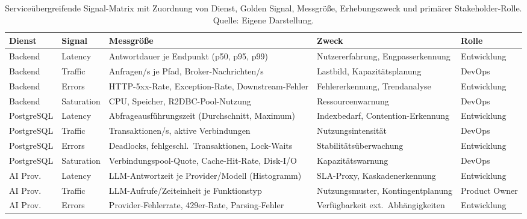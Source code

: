 \begin{table}[!htb]
\centering
\caption[Serviceübergreifende Signal-Matrix mit Zuordnung von Dienst, Golden Signal, Messgröße, Erhebungszweck und primärer Stakeholder-Rolle.]{Serviceübergreifende Signal-Matrix mit Zuordnung von Dienst, Golden Signal, Messgröße, Erhebungszweck und primärer Stakeholder-Rolle. \small Quelle: Eigene Darstellung.}
\label{tab:signal-matrix}
\small
\begin{tabularx}{\textwidth}{
  >{\RaggedRight\arraybackslash}p{1.6cm}
  >{\RaggedRight\arraybackslash}p{1.5cm}
  >{\RaggedRight\arraybackslash}p{5.3cm}
  >{\RaggedRight\arraybackslash}X
  >{\RaggedRight\arraybackslash}p{1.8cm}
}
\toprule
\textbf{Dienst} & \textbf{Signal} & \textbf{Messgröße} & \textbf{Zweck} & \textbf{Rolle} \\
\midrule
Backend   & Latency    & Antwortdauer je Endpunkt (p50, p95, p99)         & Nutzererfahrung, Engpasserkennung   & Entwicklung \\
Backend   & Traffic    & Anfragen/s je Pfad, Broker-Nachrichten/s          & Lastbild, Kapazitätsplanung         & DevOps \\
Backend   & Errors     & HTTP-5xx-Rate, Exception-Rate, Downstream-Fehler  & Fehlererkennung, Trendanalyse       & Entwicklung \\
Backend   & Saturation & CPU, Speicher, R2DBC-Pool-Nutzung                 & Ressourcenwarnung                   & DevOps \\[4pt]
PostgreSQL & Latency   & Abfrageausführungszeit (Durchschnitt, Maximum)     & Indexbedarf, Contention-Erkennung   & Entwicklung \\
PostgreSQL & Traffic   & Transaktionen/s, aktive Verbindungen               & Nutzungsintensität                  & DevOps \\
PostgreSQL & Errors    & Deadlocks, fehlgeschl.\ Transaktionen, Lock-Waits  & Stabilitätsüberwachung              & Entwicklung \\
PostgreSQL & Saturation & Verbindungspool-Quote, Cache-Hit-Rate, Disk-I/O   & Kapazitätswarnung                   & DevOps \\[4pt]
AI Prov.  & Latency    & LLM-Antwortzeit je Provider/Modell (Histogramm)    & SLA-Proxy, Kaskadenerkennung       & Entwicklung \\
AI Prov.  & Traffic    & LLM-Aufrufe/Zeiteinheit je Funktionstyp            & Nutzungsmuster, Kontingentplanung  & Product Owner \\
AI Prov.  & Errors     & Provider-Fehlerrate, 429er-Rate, Parsing-Fehler   & Verfügbarkeit ext.\ Abhängigkeiten & Entwicklung \\

\end{tabularx}
\end{table}
